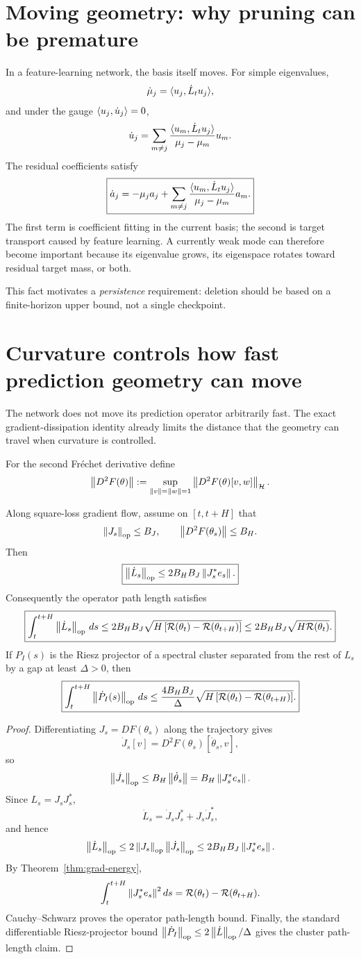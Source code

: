\section{Moving geometry: why pruning can be premature}
In a feature-learning network, the basis itself moves. For simple eigenvalues,
\[
\dot\mu_j=\langle u_j,\dot L_tu_j\rangle,
\]
and under the gauge $\langle u_j,\dot u_j\rangle=0$,
\[
\dot u_j
=\sum_{m\ne j}
\frac{\langle u_m,\dot L_tu_j\rangle}{\mu_j-\mu_m}u_m.
\]
The residual coefficients satisfy
\[
\boxed{
\dot a_j
=-\mu_ja_j
+\sum_{m\ne j}
\frac{\langle u_m,\dot L_tu_j\rangle}{\mu_j-\mu_m}a_m.}
\]
The first term is coefficient fitting in the current basis; the second is target transport caused by feature learning. A currently weak mode can therefore become important because its eigenvalue grows, its eigenspace rotates toward residual target mass, or both.

This fact motivates a \emph{persistence} requirement: deletion should be based on a finite-horizon upper bound, not a single checkpoint.

\section{Curvature controls how fast prediction geometry can move}
The network does not move its prediction operator arbitrarily fast. The exact gradient-dissipation identity already limits the distance that the geometry can travel when curvature is controlled.

For the second Fr\'echet derivative define
\[
\left\lVert D^2F(\theta)\right\rVert
:=\sup_{\left\lVert v\right\rVert=\left\lVert w\right\rVert=1}\left\lVert D^2F(\theta)[v,w]\right\rVert_{\mathcal H}.
\]

\begin{theorem}\label{thm:curvature-motion}
Along square-loss gradient flow, assume on $[t,t+H]$ that
\[
\left\lVert J_s\right\rVert_{\mathrm{op}}\le B_J,
\qquad
\left\lVert D^2F(\theta_s)\right\rVert\le B_H.
\]
Then
\[
\boxed{
\left\lVert \dot L_s\right\rVert_{\mathrm{op}}
\le 2B_HB_J\left\lVert J_s^\ast e_s\right\rVert.}
\]
Consequently the operator path length satisfies
\[
\boxed{
\int_t^{t+H}\left\lVert \dot L_s\right\rVert_{\mathrm{op}}\,ds
\le
2B_HB_J\sqrt{H\,[\mathcal R(\theta_t)-\mathcal R(\theta_{t+H})]}
\le
2B_HB_J\sqrt{H\mathcal R(\theta_t)}.}
\]
If $P_I(s)$ is the Riesz projector of a spectral cluster separated from the rest of $L_s$ by a gap at least $\Delta>0$, then
\[
\boxed{
\int_t^{t+H}\left\lVert \dot P_I(s)\right\rVert_{\mathrm{op}}\,ds
\le
\frac{4B_HB_J}{\Delta}
\sqrt{H\,[\mathcal R(\theta_t)-\mathcal R(\theta_{t+H})]}.}
\]
\end{theorem}

\begin{proof}
Differentiating $J_s=DF(\theta_s)$ along the trajectory gives
\[
\dot J_s[v]=D^2F(\theta_s)[\dot\theta_s,v],
\]
so
\[
\left\lVert \dot J_s\right\rVert_{\mathrm{op}}\le B_H\left\lVert \dot\theta_s\right\rVert
=B_H\left\lVert J_s^\ast e_s\right\rVert.
\]
Since $L_s=J_sJ_s^\ast$,
\[
\dot L_s=\dot J_sJ_s^\ast+J_s\dot J_s^\ast,
\]
and hence
\[
\left\lVert \dot L_s\right\rVert_{\mathrm{op}}
\le2\left\lVert J_s\right\rVert_{\mathrm{op}}\left\lVert \dot J_s\right\rVert_{\mathrm{op}}
\le2B_HB_J\left\lVert J_s^\ast e_s\right\rVert.
\]
By Theorem~\ref{thm:grad-energy},
\[
\int_t^{t+H}\left\lVert J_s^\ast e_s\right\rVert^2ds
=\mathcal R(\theta_t)-\mathcal R(\theta_{t+H}).
\]
Cauchy--Schwarz proves the operator path-length bound. Finally, the standard differentiable Riesz-projector bound
$\left\lVert \dot P_I\right\rVert_{\mathrm{op}}\le2\left\lVert \dot L\right\rVert_{\mathrm{op}}/\Delta$
gives the cluster path-length claim.
\end{proof}

